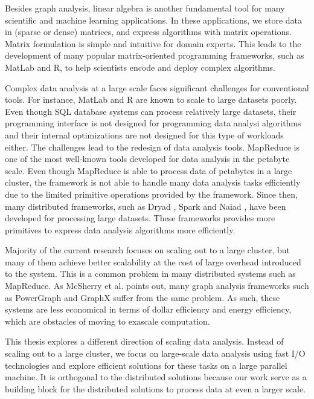 Besides graph analysis, linear algebra is another fundamental tool for many
scientific and machine learning applications. In these applications, we store
data in (sparse or dense) matrices, and express algorithms with matrix
operations. Matrix formulation is simple and intuitive for domain experts.
This leads to the development of many popular matrix-oriented programming
frameworks, such as MatLab and R, to help scientists encode and deploy complex
algorithms.

Complex data analysis at a large scale faces significant challenges for
conventional tools. For instance, MatLab and R are known to scale to large
datasets poorly. Even though SQL database systems can process relatively large
datasets, their programming interface is not designed for programming data
analysi algorithms and their internal optimizations are not designed for this
type of workloads either.
The challenges lead to the redesign of data analysis tools.
MapReduce \cite{mapreduce} is one of the most well-known tools developed for
data analysis in the petabyte scale. Even though MapReduce is able to
process data of petabytes in a large cluster, the framework is not able to
handle many data analysis tasks efficiently due to the limited primitive
operations provided by the framework. Since then, many distributed frameworks,
such as Dryad \cite{dryad}, Spark \cite{spark} and Naiad \cite{naiad}, have
been developed for processing large datasets. These frameworks provides
more primitives to express data analysis algorithms more efficiently.

Majority of the current research focuses on scaling out to a large cluster,
but many of them achieve better scalability at the cost of large overhead
introduced to the system. This is a common problem in many distributed systems
such as MapReduce. As McSherry et al. \cite{mcsherry15}
points out, many graph analysis frameworks such as PowerGraph \cite{powergraph}
and GraphX \cite{graphx} suffer from the same problem. As such, these systems
are less economical in terms of dollar efficiency and energy efficiency, which
are obstacles of moving to exascale computation.

This thesis explores a different direction of scaling data analysis. Instead
of scaling out to a large cluster, we focus on large-scale data analysis
using fast I/O technologies and explore efficient solutions for these tasks
on a large parallel machine. It is orthogonal to the distributed solutions
because our work serve as a building block for the distributed solutions to
process data at even a larger scale.

